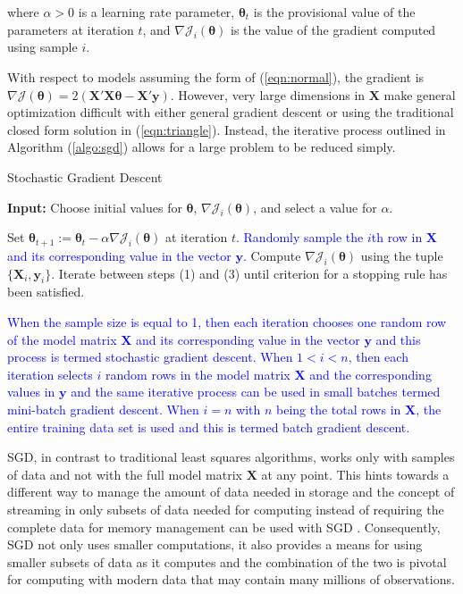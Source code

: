 \documentclass[12pt]{article}
\begin{document}
\noindent where $\alpha > 0$ is a learning rate parameter, $\bm{\theta}_t$ is the provisional value of the parameters at iteration $t$, and $\nabla\mathcal{J}_i(\bm{\theta})$ is the value of the gradient computed using sample $i$. 

With respect to models assuming the form of (\ref{eqn:normal}), the gradient is $\nabla\mathcal{J}(\bm{\theta}) = 2(\bm{X}'\bm{X}\bm{\theta}-\bm{X}'\bm{y})$. However, very large dimensions in $\bm{X}$ make general optimization difficult with either general gradient descent or using the traditional closed form solution in (\ref{eqn:triangle}). Instead, the iterative process outlined in Algorithm (\ref{algo:sgd}) allows for a large problem to be reduced simply. 

\begin{algorithm}
\caption{Stochastic Gradient Descent}
\label{algo:sgd}
	\hspace*{\algorithmicindent} \textbf{Input:} Choose initial values for $\bm{\theta}$, $\nabla\mathcal{J}_i(\bm{\theta})$, and select a value for $\alpha$.
\begin{algorithmic}[1]
	\State Set $\bm{\theta}_{t+1}:= \bm{\theta}_t - \alpha\nabla\mathcal{J}_i(\bm{\theta})$ at iteration $t$.
	\State \textcolor{blue}{Randomly sample the $i$th row in $\bm{X}$ and its corresponding value in the vector $\bm{y}$.}
	\State Compute $\nabla\mathcal{J}_i(\bm{\theta})$ using the tuple $\{\bm{X}_i, \bm{y}_i\}$.
	\State Iterate between steps (1) and (3) until criterion for a stopping rule has been satisfied. 
\end{algorithmic}
\end{algorithm}

\textcolor{blue}{When the sample size is equal to 1, then each iteration chooses one random row of the model matrix $\bm{X}$ and its corresponding value in the vector $\bm{y}$ and this process is termed stochastic gradient descent. When $1 < i < n$, then each iteration selects $i$ random rows in the model matrix $\bm{X}$ and the corresponding values in $\bm{y}$ and the same iterative process can be used in small batches termed mini-batch gradient descent. When $i=n$ with $n$ being the total rows in $\bm{X}$, the entire training data set is used and this is termed batch gradient descent.}

SGD, in contrast to traditional least squares algorithms, works only with samples of data and not with the full model matrix $\bm{X}$ at any point. This hints towards a different way to manage the amount of data needed in storage and the concept of streaming in only subsets of data needed for computing instead of requiring the complete data for memory management can be used with SGD \cite{tran}. Consequently, SGD not only uses smaller computations, it also provides a means for using smaller subsets of data as it computes and the combination of the two is pivotal for computing with modern data that may contain many millions of observations. 
\end{document}
